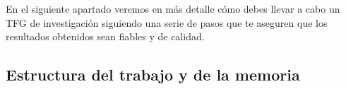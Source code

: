 

   
En el siguiente apartado veremos en más detalle cómo debes llevar a cabo un TFG de investigación siguiendo una serie de pasos que te aseguren que los resultados obtenidos sean fiables y de calidad.

\subsection{Estructura del trabajo y de la memoria}
\label{tfx_inv_s_est_trabajo_memoria}


